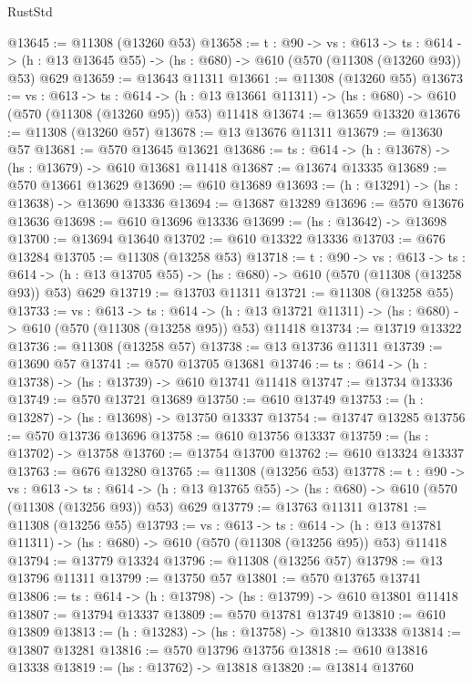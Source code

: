 \begin{lexlean}{RustStd}
\begin{coremodule}
@13645 := @11308 (@13260 @53)
@13658 := {t : @90} ->
  {vs : @613} ->
  {ts : @614} -> (h : @13 @13645 @55) -> (hs : @680) -> @610 (@570 (@11308 (@13260 @93)) @53) @629
@13659 := @13643 @11311
@13661 := @11308 (@13260 @55)
@13673 := {vs : @613} ->
  {ts : @614} ->
  (h : @13 @13661 @11311) -> (hs : @680) -> @610 (@570 (@11308 (@13260 @95)) @53) @11418
@13674 := @13659 @13320
@13676 := @11308 (@13260 @57)
@13678 := @13 @13676 @11311
@13679 := @13630 @57
@13681 := @570 @13645 @13621
@13686 := {ts : @614} -> (h : @13678) -> (hs : @13679) -> @610 @13681 @11418
@13687 := @13674 @13335
@13689 := @570 @13661 @13629
@13690 := @610 @13689
@13693 := (h : @13291) -> (hs : @13638) -> @13690 @13336
@13694 := @13687 @13289
@13696 := @570 @13676 @13636
@13698 := @610 @13696 @13336
@13699 := (hs : @13642) -> @13698
@13700 := @13694 @13640
@13702 := @610 @13322 @13336
@13703 := @676 @13284
@13705 := @11308 (@13258 @53)
@13718 := {t : @90} ->
  {vs : @613} ->
  {ts : @614} -> (h : @13 @13705 @55) -> (hs : @680) -> @610 (@570 (@11308 (@13258 @93)) @53) @629
@13719 := @13703 @11311
@13721 := @11308 (@13258 @55)
@13733 := {vs : @613} ->
  {ts : @614} ->
  (h : @13 @13721 @11311) -> (hs : @680) -> @610 (@570 (@11308 (@13258 @95)) @53) @11418
@13734 := @13719 @13322
@13736 := @11308 (@13258 @57)
@13738 := @13 @13736 @11311
@13739 := @13690 @57
@13741 := @570 @13705 @13681
@13746 := {ts : @614} -> (h : @13738) -> (hs : @13739) -> @610 @13741 @11418
@13747 := @13734 @13336
@13749 := @570 @13721 @13689
@13750 := @610 @13749
@13753 := (h : @13287) -> (hs : @13698) -> @13750 @13337
@13754 := @13747 @13285
@13756 := @570 @13736 @13696
@13758 := @610 @13756 @13337
@13759 := (hs : @13702) -> @13758
@13760 := @13754 @13700
@13762 := @610 @13324 @13337
@13763 := @676 @13280
@13765 := @11308 (@13256 @53)
@13778 := {t : @90} ->
  {vs : @613} ->
  {ts : @614} -> (h : @13 @13765 @55) -> (hs : @680) -> @610 (@570 (@11308 (@13256 @93)) @53) @629
@13779 := @13763 @11311
@13781 := @11308 (@13256 @55)
@13793 := {vs : @613} ->
  {ts : @614} ->
  (h : @13 @13781 @11311) -> (hs : @680) -> @610 (@570 (@11308 (@13256 @95)) @53) @11418
@13794 := @13779 @13324
@13796 := @11308 (@13256 @57)
@13798 := @13 @13796 @11311
@13799 := @13750 @57
@13801 := @570 @13765 @13741
@13806 := {ts : @614} -> (h : @13798) -> (hs : @13799) -> @610 @13801 @11418
@13807 := @13794 @13337
@13809 := @570 @13781 @13749
@13810 := @610 @13809
@13813 := (h : @13283) -> (hs : @13758) -> @13810 @13338
@13814 := @13807 @13281
@13816 := @570 @13796 @13756
@13818 := @610 @13816 @13338
@13819 := (hs : @13762) -> @13818
@13820 := @13814 @13760

\end{coremodule}
\end{lexlean}
